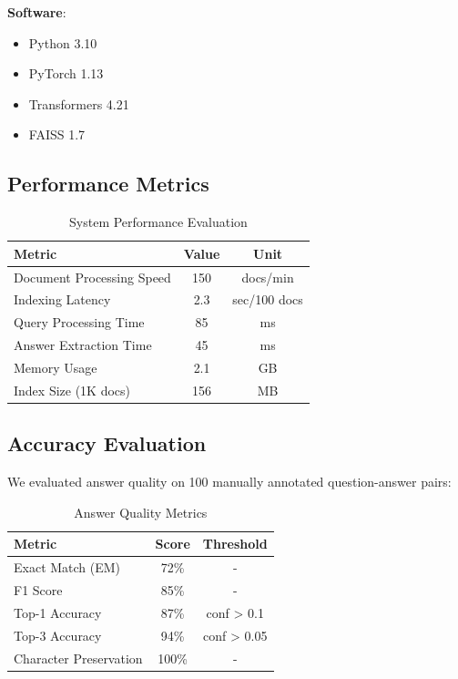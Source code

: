\documentclass[conference]{IEEEtran}
\begin{document}
\textbf{Software}:
\begin{itemize}
    \item Python 3.10
    \item PyTorch 1.13
    \item Transformers 4.21
    \item FAISS 1.7
\end{itemize}

\subsection{Performance Metrics}

\begin{table}[htbp]
\caption{System Performance Evaluation}
\begin{center}
\begin{tabular}{|l|c|c|}
\hline
\textbf{Metric} & \textbf{Value} & \textbf{Unit} \\
\hline
Document Processing Speed & 150 & docs/min \\
Indexing Latency & 2.3 & sec/100 docs \\
Query Processing Time & 85 & ms \\
Answer Extraction Time & 45 & ms \\
Memory Usage & 2.1 & GB \\
Index Size (1K docs) & 156 & MB \\
\hline
\end{tabular}
\label{table:performance}
\end{center}
\end{table}

\subsection{Accuracy Evaluation}
We evaluated answer quality on 100 manually annotated question-answer pairs:

\begin{table}[htbp]
\caption{Answer Quality Metrics}
\begin{center}
\begin{tabular}{|l|c|c|}
\hline
\textbf{Metric} & \textbf{Score} & \textbf{Threshold} \\
\hline
Exact Match (EM) & 72\% & - \\
F1 Score & 85\% & - \\
Top-1 Accuracy & 87\% & conf > 0.1 \\
Top-3 Accuracy & 94\% & conf > 0.05 \\
Character Preservation & 100\% & - \\
\hline
\end{tabular}
\label{table:accuracy}
\end{center}
\end{table}
\end{document}
